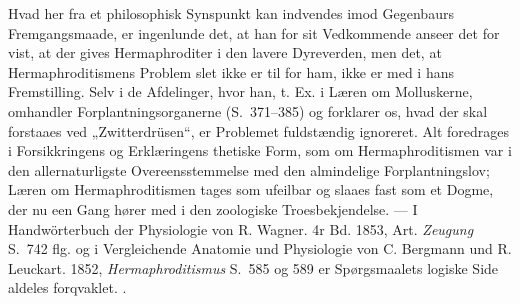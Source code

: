 \documentclass[11pt]{book}
\begin{document}
{Hvad her fra et philosophisk Synspunkt kan indvendes imod Gegenbaurs
Fremgangsmaade, er ingenlunde det, at han for sit Vedkommende anseer
det for vist, at der gives Hermaphroditer i den lavere Dyreverden, men
det, at Hermaphroditismens Problem slet ikke er til for ham, ikke er
med i hans Fremstilling. Selv i de Afdelinger, hvor han, t. Ex. i
Læren om Molluskerne, omhandler Forplantningsorganerne (S.~371--385)
og forklarer os, hvad der skal forstaaes ved „Zwitterdrüsen“, er
Problemet fuldstændig ignoreret. Alt foredrages i Forsikkringens og
Erklæringens thetiske Form, som om Hermaphroditismen var i den
allernaturligste Overeensstemmelse med den almindelige
Forplantningslov; Læren om Hermaphroditismen tages som ufeilbar og
slaaes fast som et Dogme, der nu een Gang hører med i den zoologiske
Troesbekjendelse. --- I Handwörterbuch der Physiologie von R. Wagner.
4r Bd. 1853, Art. \emph{Zeugung} S.~742 flg. og i Vergleichende
Anatomie
und Physiologie von C. Bergmann und R. Leuckart. 1852,
\emph{Hermaphroditismus} S.~585 og 589 er Spørgsmaalets logiske Side
aldeles forqvaklet.
}.
\end{document}
